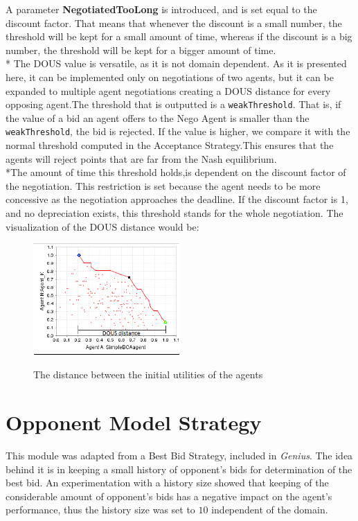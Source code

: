 \documentclass[html]{report}    %
\begin{document}
 A parameter \textbf{NegotiatedTooLong} is introduced, and is set equal to the discount factor. That means that whenever the discount is a small number, the threshold will be kept for a small amount of time, whereas if the discount is a big number, the threshold will be kept for a bigger amount of time.
\\* The DOUS value is versatile, as it is not domain dependent.
As it is presented here, it can be implemented only on negotiations of two agents, but it can be expanded to multiple agent negotiations creating a DOUS distance for every opposing agent.The threshold that is outputted is a \texttt{weakThreshold}. That is, if the value of a bid an agent offers to the Nego Agent is smaller than the \texttt{weakThreshold}, the bid is rejected. If the value is higher, we compare it with the normal threshold computed in the Acceptance Strategy.This ensures that the agents will reject points that are far from the Nash equilibrium.
\\*The amount of time this threshold holds,is dependent on the discount factor of the negotiation. This restriction is set because the agent needs to be more concessive as the negotiation approaches the deadline. If the discount factor is 1, and no depreciation exists, this threshold stands for the whole negotiation. 
The visualization of the DOUS distance would be:

\begin{figure}[htbp]
  \caption{The distance between the initial utilities of the agents}
  \centering
    \includegraphics[width=0.5\textwidth]{dous}
    \label{3}
\end{figure}

\section{Opponent Model Strategy}  

This module was adapted from a Best Bid Strategy, included in \textit{Genius}. The idea behind it is in keeping a small history of opponent's bids for determination of the best bid. An experimentation with a history size showed that keeping of the considerable amount of opponent's bids has a negative impact on the agent's performance, thus the history size was set to $10$ independent of the domain.
\end{document}
